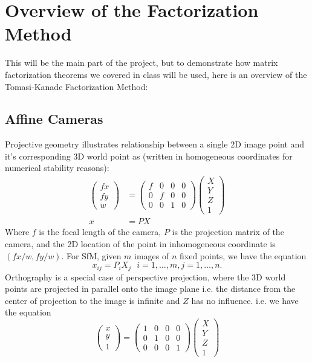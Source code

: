 \documentclass[a4paper]{article}
\begin{document}
\section{Overview of the Factorization Method}
This will be the main part of the project, but to demonstrate how
matrix factorization theorems we covered in class will be used, here
is an overview of the Tomasi-Kanade Factorization Method:

\subsection{Affine Cameras}
Projective geometry illustrates relationship between a single 2D image
point and it's corresponding 3D world point as (written in
homogeneous coordinates for numerical stability reasons): 
\begin{align*}
\begin{pmatrix}
  fx\\fy\\w
\end{pmatrix} &= \begin{pmatrix}
  f&0 & 0& 0 \\0 & f& 0 & 0 \\ 0 & 0 & 1 & 0 
\end{pmatrix}
\begin{pmatrix}
  X\\Y\\Z\\1
\end{pmatrix} \\
x &= PX
\end{align*}
Where $f$ is the focal length of the camera, $P$ is the projection
matrix of the camera, and the 2D location of the point in inhomogeneous coordinate is
$(fx/w, fy/w)$. For SfM, given $m$ images of $n$ fixed points, we have the equation $$x_{ij} = P_iX_j
\text{ }i=1,\dots,m, j=1,\dots,n.$$
 Orthography is a special case of perspective projection, where the 3D
world points are projected in parallel onto the image plane i.e. the
distance from the center of projection to the image is infinite and
$Z$ has no influence. 
i.e. we have the equation
$$\begin{pmatrix}
  x\\y\\1
\end{pmatrix}= \begin{pmatrix}
  1&0 & 0& 0 \\0 & 1& 0 & 0 \\ 0 & 0 & 0 & 1
\end{pmatrix}
\begin{pmatrix}
  X\\Y\\Z\\1
\end{pmatrix}$$
\end{document}
